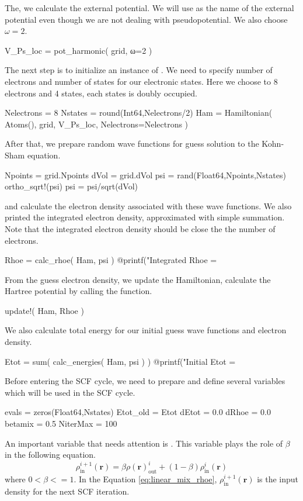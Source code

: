 The, we calculate the external potential. We will use  as the name of
the external potential even though we are not dealing with pseudopotential.
We also choose $\omega=2$.
\begin{juliacode}
V_Ps_loc = pot_harmonic( grid, ω=2 )
\end{juliacode}

The next step is to initialize an instance of . We need to specify
number of electrons and number of states for our electronic states. Here we choose to 8
electrons and 4 states, each states is doubly occupied.
\begin{juliacode}
Nelectrons = 8
Nstates = round(Int64,Nelectrons/2)
Ham = Hamiltonian( Atoms(), grid, V_Ps_loc, Nelectrons=Nelectrons )
\end{juliacode}

After that, we prepare random wave functions for guess solution to the Kohn-Sham equation.
\begin{juliacode}
Npoints = grid.Npoints
dVol = grid.dVol
psi = rand(Float64,Npoints,Nstates)
ortho_sqrt!(psi)
psi = psi/sqrt(dVol)
\end{juliacode}
and calculate the electron density associated with these wave functions.
We also printed the integrated electron density, approximated with simple summation.
Note that the integrated electron density should be close the the number of electrons.
\begin{juliacode}
Rhoe = calc_rhoe( Ham, psi )
@printf("Integrated Rhoe = %
\end{juliacode}

From the guess electron density, we update the Hamiltonian, calculate the
Hartree potential by calling the  function.
\begin{juliacode}
update!( Ham, Rhoe )
\end{juliacode}

We also calculate total energy for our initial guess wave functions and electron
density.
\begin{juliacode}
Etot = sum( calc_energies( Ham, psi ) )
@printf("Initial Etot = %
\end{juliacode}

Before entering the SCF cycle, we need to prepare and define several variables
which will be used in the SCF cycle.
\begin{juliacode}
evals = zeros(Float64,Nstates)
Etot_old = Etot
dEtot = 0.0
dRhoe = 0.0
betamix = 0.5
NiterMax = 100
\end{juliacode}
An important variable that needs attention is . This variable
plays the role of $\beta$ in the following equation.
\begin{equation}
\rho^{i+1}_{\mathrm{in}}(\mathbf{r}) = \beta\rho(\mathbf{r})^{i}_{\mathrm{out}} +
(1 - \beta)\rho^{i}_{\mathrm{in}}(\mathbf{r})
\label{eq:linear_mix_rhoe}
\end{equation}
where $0 < \beta <= 1$.
In the Equation \eqref{eq:linear_mix_rhoe}, $\rho^{i+1}_{\mathrm{in}}(\mathbf{r})$
is the input density for the next SCF iteration.

